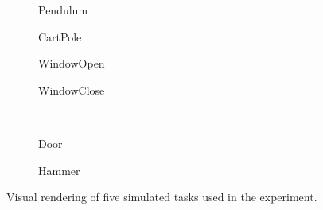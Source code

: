 \begin{figure}[H]
  \centering
  \begin{subfigure}[b]{0.2\textwidth}
    \centering
    \caption{Pendulum}
  \end{subfigure}
  \hfill
  \begin{subfigure}[b]{0.2\textwidth}
    \centering
    \caption{CartPole}
  \end{subfigure}
  \hfill
  \begin{subfigure}[b]{0.25\textwidth}
    \centering
    \caption{WindowOpen}
  \end{subfigure}
  \hfill
  \begin{subfigure}[b]{0.25\textwidth}
    \centering
    \caption{WindowClose}
  \end{subfigure}\\
  \par\bigskip
  \begin{subfigure}[b]{0.2\textwidth}
    \centering
    \caption{Door}
  \end{subfigure}
  \hspace{4em}
  \begin{subfigure}[b]{0.2\textwidth}
    \centering
    \caption{Hammer}
  \end{subfigure}
  \caption{Visual rendering of five simulated tasks used in the experiment.\label{fig:Tasks}}
\end{figure}
\unskip

